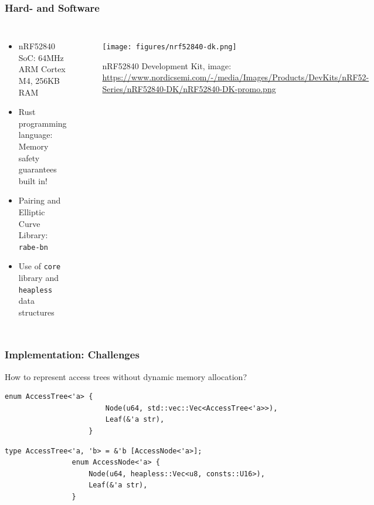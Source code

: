 \begin{frame}
    \frametitle{Hard- and Software}
    \begin{columns}[c]
        \begin{itemize}
            \item nRF52840 SoC: \textcolor{TUMBlau}{64MHz} ARM Cortex M4, \textcolor{TUMBlau}{256KB RAM}
            \item Rust programming language: Memory safety guarantees built in!
            \item Pairing and Elliptic Curve Library: \texttt{rabe-bn}\footnotemark
            \item Use of \texttt{core} library and \texttt{heapless} data structures\footnotemark
        \end{itemize}
        
        \begin{figure}
            \texttt{[image: figures/nrf52840-dk.png]}
            \caption{nRF52840 Development Kit, image: \url{https://www.nordicsemi.com/-/media/Images/Products/DevKits/nRF52-Series/nRF52840-DK/nRF52840-DK-promo.png}}
        \end{figure}
    \end{columns}
\end{frame}

\begin{frame}[c, fragile]
    \frametitle{Implementation: Challenges}
    \begin{block}{How to represent access trees without dynamic memory allocation?}
        \begin{center}
            \begin{minipage}{0.7\textwidth}
                \begin{lstlisting}[caption={Naive implementation (uses standard library)}]
                    enum AccessTree<'a> {
                        Node(u64, std::vec::Vec<AccessTree<'a>>),
                        Leaf(&'a str),
                    }
                \end{lstlisting}
            \begin{lstlisting}[caption={Refined implementation}]
                type AccessTree<'a, 'b> = &'b [AccessNode<'a>];
                enum AccessNode<'a> {
                    Node(u64, heapless::Vec<u8, consts::U16>),
                    Leaf(&'a str),
                }
                \end{lstlisting}
            \end{minipage}
        \end{center}
    \end{block}
\end{frame}

